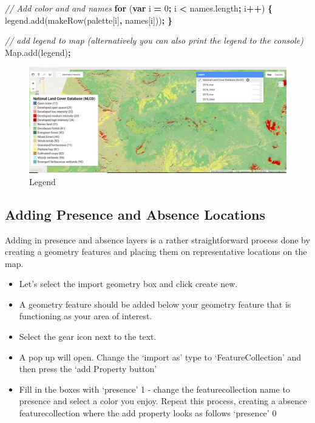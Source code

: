 \documentclass[]{article}
\newenvironment{Shaded}{\begin{snugshade}}{\end{snugshade}}
\newcommand{\KeywordTok}[1]{\textcolor[rgb]{0.13,0.29,0.53}{\textbf{#1}}}
\newcommand{\DecValTok}[1]{\textcolor[rgb]{0.00,0.00,0.81}{#1}}
\newcommand{\CommentTok}[1]{\textcolor[rgb]{0.56,0.35,0.01}{\textit{#1}}}
\newcommand{\VariableTok}[1]{\textcolor[rgb]{0.00,0.00,0.00}{#1}}
\newcommand{\ControlFlowTok}[1]{\textcolor[rgb]{0.13,0.29,0.53}{\textbf{#1}}}
\newcommand{\OperatorTok}[1]{\textcolor[rgb]{0.81,0.36,0.00}{\textbf{#1}}}
\newcommand{\AttributeTok}[1]{\textcolor[rgb]{0.77,0.63,0.00}{#1}}
\newcommand{\NormalTok}[1]{#1}
\begin{document}
\begin{Shaded}
\begin{Highlighting}[]
\CommentTok{// Add color and and names}
\ControlFlowTok{for}\NormalTok{ (}\KeywordTok{var}\NormalTok{ i }\OperatorTok{=} \DecValTok{0}\OperatorTok{;}\NormalTok{ i }\OperatorTok{<} \VariableTok{names}\NormalTok{.}\AttributeTok{length}\OperatorTok{;}\NormalTok{ i}\OperatorTok{++}\NormalTok{) }\OperatorTok{\{}
  \VariableTok{legend}\NormalTok{.}\AttributeTok{add}\NormalTok{(}\AttributeTok{makeRow}\NormalTok{(palette[i]}\OperatorTok{,}\NormalTok{ names[i]))}\OperatorTok{;}
  \OperatorTok{\}}  

\CommentTok{// add legend to map (alternatively you can also print the legend to the console)  }
\VariableTok{Map}\NormalTok{.}\AttributeTok{add}\NormalTok{(legend)}\OperatorTok{;}  
\end{Highlighting}
\end{Shaded}

\begin{figure}
\centering
\includegraphics{Legend_NLCD_ScreenShot.png}
\caption{Legend}
\end{figure}

\subsection{Adding Presence and Absence
Locations}\label{adding-presence-and-absence-locations}

Adding in presence and absence layers is a rather straightforward
process done by creating a geometry features and placing them on
representative locations on the map.

\begin{itemize}
\item
  Let's select the import geometry box and click create new.
\item
  A geometry feature should be added below your geometry feature that is
  functioning as your area of interest.
\item
  Select the gear icon next to the text.
\item
  A pop up will open. Change the `import as' type to `FeatureCollection'
  and then press the `add Property button'
\item
  Fill in the boxes with `presence' \textbar{} 1 - change the
  featurecollection name to presence and select a color you enjoy.
  Repeat this process, creating a absence featurecollection where the
  add property looks as follows `presence' \textbar{} 0
\end{itemize}
\end{document}
